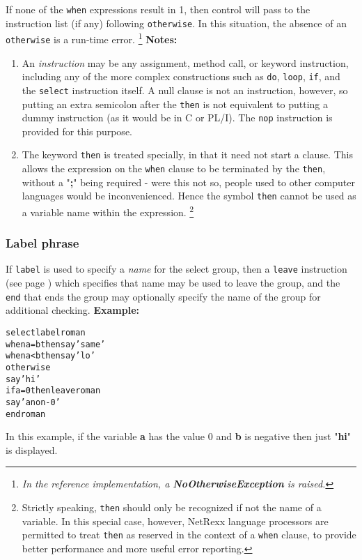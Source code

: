 If none of the \texttt{when} expressions result in 1, then control will
pass to the instruction list (if any) following \texttt{otherwise}.
In this situation, the absence of an \texttt{otherwise} is a run-time
error.
\footnote{
\emph{In the reference implementation, a \textbf{NoOtherwiseException}
is raised.}
}
 \textbf{Notes:}
\begin{enumerate}
\item An \emph{instruction} may be any assignment, method call, or keyword
instruction, including any of the more complex constructions such as
\texttt{do}, \texttt{loop}, \texttt{if}, and the \texttt{select}
instruction itself.
A null clause is not an instruction, however, so putting an extra
semicolon after the \texttt{then} is not equivalent to putting a dummy
instruction (as it would be in C or PL/I).
The \texttt{nop} instruction is provided for this purpose.
\item The keyword \texttt{then} is treated specially, in that it need not
start a clause.
This allows the expression on the \texttt{when} clause to be terminated
by the \texttt{then}, without a "\textbf{;}" being required
- were this not so, people used to other computer languages would
be inconvenienced.
Hence the symbol \texttt{then} cannot be used as a variable name within
the expression.
\footnote{
Strictly speaking, \texttt{then} should only be recognized if not
the name of a variable.  In this special case, however, NetRexx language
processors are permitted to treat \texttt{then} as reserved in the
context of a \texttt{when} clause, to provide better performance and
more useful error reporting.
}
\end{enumerate}
\subsubsection{Label phrase}
 
If \texttt{label} is used to specify a \emph{name} for the select
group, then a  \texttt{leave} instruction (see page \pageref{refleave})  which
specifies that name may be used to leave the group, and the \texttt{end}
that ends the group may optionally specify the name of the group for
additional checking.
 \textbf{Example:}
\begin{alltt}
select label roman
  when a=b then say 'same'
  when a<b then say 'lo'
  otherwise
    say 'hi'
    if a=0 then leave roman
    say 'a non-0'
  end roman
\end{alltt}
In this example, if the variable \textbf{a} has the value 0
and \textbf{b} is negative then just "\textbf{hi}" is
displayed.
